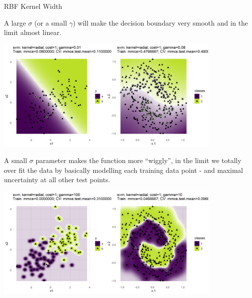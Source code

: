 \documentclass[11pt,compress,t,notes=noshow, xcolor=table]{beamer}
\begin{document}
\begin{vbframe}{RBF Kernel Width}

A large $\sigma$ (or a small $\gamma$) will make the decision boundary very smooth and in the limit almost linear. 

\begin{center}
\includegraphics[width = 11cm ]{figure/svm_rbf_kernel_gamma_1.png}
\end{center}

\framebreak

A small $\sigma$ parameter makes the function more \enquote{wiggly}, in the limit we totally over fit the data by basically modelling each training data point - and maximal uncertainty at all other test points.

\begin{center}
\includegraphics[width = 11cm ]{figure/svm_rbf_kernel_gamma_2.png}
\end{center}

\end{vbframe}
\endlecture
\end{document}

